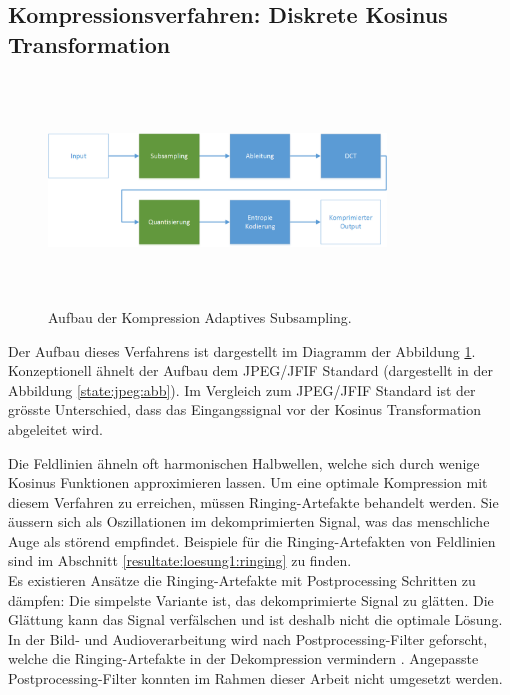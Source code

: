 \subsection{Kompressionsverfahren: Diskrete Kosinus Transformation}\label{konzept:loesung1}
\begin{figure}[!htbp]
	\center
	\includegraphics[width=0.8\textwidth,height=6cm,keepaspectratio]{./pictures/konzept/solution1/aufbau.png}
	\caption{Aufbau der Kompression Adaptives Subsampling.}
	\label{konzept:loesung1:aufbau}
\end{figure} 
Der Aufbau dieses Verfahrens ist dargestellt im Diagramm der Abbildung \ref{konzept:loesung1:aufbau}. Konzeptionell ähnelt der Aufbau dem JPEG/JFIF Standard (dargestellt in der Abbildung \ref{state:jpeg:abb}). Im Vergleich zum JPEG/JFIF Standard ist der grösste Unterschied, dass das Eingangssignal vor der Kosinus Transformation abgeleitet wird.

Die Feldlinien ähneln oft harmonischen Halbwellen, welche sich durch wenige Kosinus Funktionen approximieren lassen. Um eine optimale Kompression mit diesem Verfahren zu erreichen, müssen Ringing-Artefakte \cite{wiki:ringing:artefacts} behandelt werden. Sie äussern sich als Oszillationen im dekomprimierten Signal, was das menschliche Auge als störend empfindet. Beispiele für die Ringing-Artefakten von Feldlinien sind im Abschnitt \ref{resultate:loesung1:ringing} zu finden.\\
Es existieren Ansätze die Ringing-Artefakte mit Postprocessing Schritten zu dämpfen: Die simpelste Variante ist, das dekomprimierte Signal zu glätten. Die Glättung kann das Signal verfälschen und ist deshalb nicht die optimale Lösung. In der Bild- und Audioverarbeitung wird nach Postprocessing-Filter geforscht, welche die Ringing-Artefakte in der Dekompression vermindern \cite{kaup1998reduction} \cite{park1999postprocessing}. Angepasste Postprocessing-Filter konnten im Rahmen dieser Arbeit nicht umgesetzt werden. 

